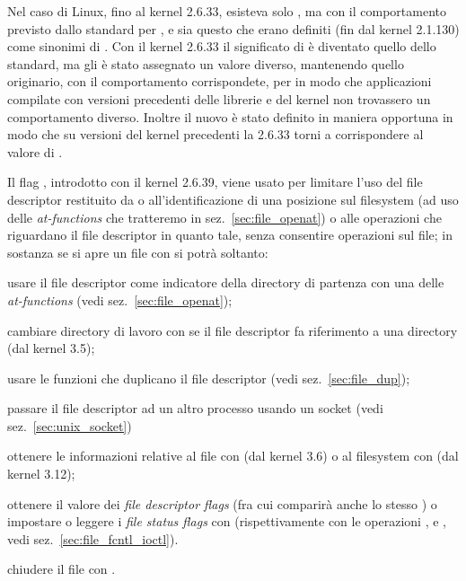 Nel caso di Linux, fino al kernel 2.6.33, esisteva solo , ma
con il comportamento previsto dallo standard per , e sia
questo che  erano definiti (fin dal kernel 2.1.130) come
sinonimi di .  Con il kernel 2.6.33 il significato di
 è diventato quello dello standard, ma gli è stato assegnato un
valore diverso, mantenendo quello originario, con il comportamento
corrispondete, per  in modo che applicazioni compilate con
versioni precedenti delle librerie e del kernel non trovassero un
comportamento diverso.  Inoltre il nuovo  è stato definito in
maniera opportuna in modo che su versioni del kernel precedenti la 2.6.33
torni a corrispondere al valore di .


Il flag ,\label{open_o_path_flag} introdotto con il kernel
2.6.39, viene usato per limitare l'uso del file descriptor restituito da
 o all'identificazione di una posizione sul filesystem (ad uso
delle \textit{at-functions} che tratteremo in sez.~\ref{sec:file_openat}) o
alle operazioni che riguardano il file descriptor in quanto tale, senza
consentire operazioni sul file; in sostanza se si apre un file con
 si potrà soltanto:
\begin{itemize*}
\item usare il file descriptor come indicatore della directory di partenza con
  una delle \textit{at-functions} (vedi sez.~\ref{sec:file_openat});
\item cambiare directory di lavoro con  se il file descriptor fa
  riferimento a una directory (dal kernel 3.5);
\item usare le funzioni che duplicano il file descriptor (vedi
  sez.~\ref{sec:file_dup});
\item passare il file descriptor ad un altro processo usando un socket
   (vedi sez.~\ref{sec:unix_socket})
\item ottenere le informazioni relative al file con  (dal kernel
  3.6) o al filesystem con  (dal kernel 3.12);
\item ottenere il valore dei \textit{file descriptor flags} (fra cui comparirà
  anche lo stesso ) o impostare o leggere i \textit{file status
    flags} con  (rispettivamente con le operazioni
  ,  e , vedi
  sez.~\ref{sec:file_fcntl_ioctl}).
\item chiudere il file con .
\end{itemize*}

